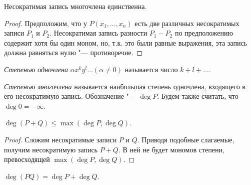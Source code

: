 \begin{corollary}
	Несократимая запись многочлена единственна.
\end{corollary}

\begin{proof}
	Предположим, что у $P(x_1,\dots, x_n)$ есть две различных несократимых записи $P_1$ и $P_2$. Несократимая запись разности $P_1 - P_2$ по предположению содержит хотя бы один моном, но, т.\:к. это были равные выражения, эта запись должна равняться нулю "--- противоречие.
\end{proof}

\begin{definition}
	\textit{Степенью одночлена} $\alpha x^ky^l \dots (\alpha \ne 0)$ называется число $k + l + \dots$.
\end{definition}

\begin{definition}
	\textit{Степенью многочлена} называется наибольшая степень одночлена, входящего в его несократимую запись. Обозначение "--- $\deg{P}$. Будем также считать, что $\deg{0} = -\infty$.
\end{definition}

\begin{proposition}
	$\deg{(P + Q)} \le \max(\deg{P}, \deg{Q})$.
\end{proposition}

\begin{proof}
	Сложим несократимые записи $P$ и $Q$. Приводя подобные слагаемые, получим несократимую запись $P+Q$. В ней не будет мономов степени, превосходящей $\max(\deg{P}, \deg{Q})$.
\end{proof}

\begin{proposition}
	$\deg{(PQ)} = \deg{P} + \deg{Q}$.
\end{proposition}

